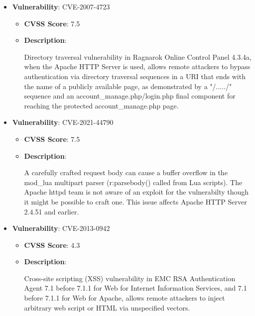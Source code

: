 \documentclass{article}
\begin{document}
\begin{itemize}
        \item \textbf{Vulnerability}: CVE-2007-4723
        \begin{itemize}
            \item \textbf{CVSS Score}:  7.5 
            \item \textbf{Description}:
            \parbox[t]{0.9\linewidth}{
                \ttfamily Directory traversal vulnerability in Ragnarok Online Control Panel 4.3.4a, when the Apache HTTP Server is used, allows remote attackers to bypass authentication via directory traversal sequences in a URI that ends with the name of a publicly available page, as demonstrated by a "/...../" sequence and an account\_manage.php/login.php final component for reaching the protected account\_manage.php page.
            }
        \end{itemize}
    
        \item \textbf{Vulnerability}: CVE-2021-44790
        \begin{itemize}
            \item \textbf{CVSS Score}:  7.5 
            \item \textbf{Description}:
            \parbox[t]{0.9\linewidth}{
                \ttfamily A carefully crafted request body can cause a buffer overflow in the mod\_lua multipart parser (r:parsebody() called from Lua scripts). The Apache httpd team is not aware of an exploit for the vulnerabilty though it might be possible to craft one. This issue affects Apache HTTP Server 2.4.51 and earlier.
            }
        \end{itemize}
    
        \item \textbf{Vulnerability}: CVE-2013-0942
        \begin{itemize}
            \item \textbf{CVSS Score}:  4.3 
            \item \textbf{Description}:
            \parbox[t]{0.9\linewidth}{
                \ttfamily Cross-site scripting (XSS) vulnerability in EMC RSA Authentication Agent 7.1 before 7.1.1 for Web for Internet Information Services, and 7.1 before 7.1.1 for Web for Apache, allows remote attackers to inject arbitrary web script or HTML via unspecified vectors.
            }
        \end{itemize}
    

\end{itemize}
\end{document}
